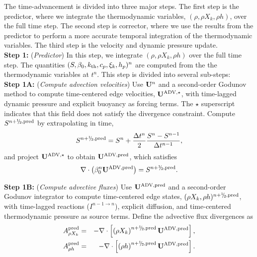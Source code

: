 The time-advancement is divided into three major steps.  The first step is the predictor, where we integrate the thermodynamic variables, $(\rho,\rho X_k,\rho h)$, over the full time step.  The second step is corrector, where we use the results from the predictor to perform a more accurate temporal integration of the thermodynamic variables.  The third step is the velocity and dynamic pressure update.\\

{\bf Step 1:} ({\it Predictor}) In this step, we integrate $(\rho, \rho X_k, \rho h)$ over the full time step.  The quantities $(S, \beta_0, k_{\rm th}, c_p, \xi_k, h_p)^n$ are computed from the the thermodynamic variables at $t^n$.  This step is divided into several sub-steps:\\

{\bf Step 1A:} ({\it Compute advection velocities}) Use ${\bf U}^n$ and a second-order Godunov method to compute time-centered edge velocities, $\mathbf{U}^{\mathrm{ADV},\star}$, with time-lagged dynamic pressure and explicit buoyancy as forcing terms.  The $\star$ superscript indicates that this field does not satisfy the divergence constraint.  Compute $S^{n+\myhalf,{\rm pred}}$ by extrapolating in time,
\begin{equation}
S^{n+\myhalf,{\rm pred}} = S^n + \frac{\Delta t^n}{2}\frac{S^n - S^{n-1}}{\Delta t^{n-1}},
\end{equation}
and project $\mathbf{U}^{\mathrm{ADV},\star}$ to obtain $\mathbf{U}^{\mathrm{ADV},\mathrm{pred}}$, which satisfies
\begin{equation}
\nabla\cdot\left(\beta_0^n\uadvsdcpred\right) = S^{n+\myhalf,\rm{pred}}.
\end{equation}

{\bf Step 1B:} ({\it Compute advective fluxes}) Use $\mathbf{U}^{\mathrm{ADV},\mathrm{pred}}$ and a second-order Godunov integrator to compute time-centered edge states, $(\rho X_k, \rho h)^{n+\myhalf,{\rm pred}}$, with time-lagged reactions ($I^{n-1\rightarrow n}$), explicit diffusion, and time-centered thermodynamic pressure as source terms.  Define the advective flux divergences as
\begin{eqnarray}
A_{\rho X_k}^{\rm pred} &=& -\nabla\cdot\left[\left(\rho X_k\right)^{n+\myhalf,{\rm pred}}\uadvsdcpred\right],\\
A_{\rho h}^{\rm pred} &=& -\nabla\cdot\left[\left(\rho h\right)^{n+\myhalf,{\rm pred}}\uadvsdcpred\right].
\end{eqnarray}

